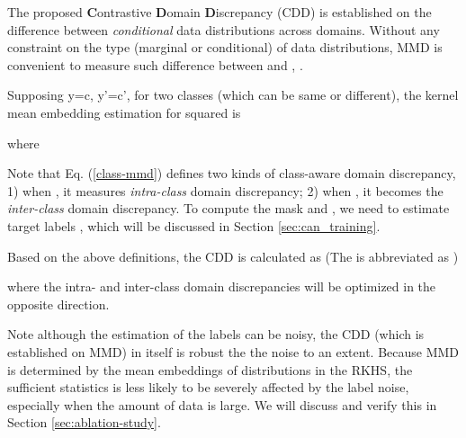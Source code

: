 \documentclass[10pt,twocolumn,letterpaper]{article}
\begin{document}
The proposed \textbf{C}ontrastive \textbf{D}omain \textbf{D}iscrepancy (CDD) is established on 
the difference between 
\textit{conditional} data distributions across domains.
Without any constraint on the type (\eg marginal or conditional) of data distributions, 
MMD is convenient to measure such difference between  and , \ie 
.



Supposing 
y=c, y'=c', 
for two classes  (which can be same or different),
the kernel mean embedding estimation for squared  is 

where

Note that Eq. (\ref{class-mmd}) defines two kinds of class-aware domain discrepancy,
1) when , it measures \textit{intra-class} domain discrepancy; 
2) when , it becomes the \textit{inter-class} domain discrepancy.
To compute the mask  and
,
we need to estimate target labels , 
which will be discussed in Section \ref{sec:can_training}.

Based on the above definitions,
the CDD is calculated as 
(The  
is abbreviated as )
\vspace{-2mm}

where the intra- and inter-class domain discrepancies will be optimized in the opposite direction.

Note although the estimation of the labels  can be noisy,
the CDD (which is established on MMD) in itself is robust the the noise to an extent.
Because MMD is determined by the mean embeddings of distributions in the RKHS, 
the sufficient statistics is less likely to be severely affected by the label noise, 
especially when the amount of data is large.
We will discuss and verify this in Section \ref{sec:ablation-study}.
\end{document}
